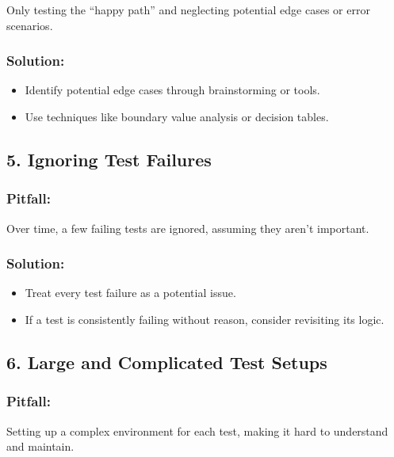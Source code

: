 \documentclass[
]{article}
\providecommand{\tightlist}{%
  \setlength{\itemsep}{0pt}\setlength{\parskip}{0pt}}
\begin{document}
Only testing the ``happy path'' and neglecting potential edge cases or
error scenarios.

\subsubsection{Solution:}\label{solution-3}

\begin{itemize}
\tightlist
\item
  Identify potential edge cases through brainstorming or tools.
\item
  Use techniques like boundary value analysis or decision tables.
\end{itemize}

\subsection{5. Ignoring Test Failures}\label{ignoring-test-failures}

\subsubsection{Pitfall:}\label{pitfall-4}

Over time, a few failing tests are ignored, assuming they aren't
important.

\subsubsection{Solution:}\label{solution-4}

\begin{itemize}
\tightlist
\item
  Treat every test failure as a potential issue.
\item
  If a test is consistently failing without reason, consider revisiting
  its logic.
\end{itemize}

\subsection{6. Large and Complicated Test
Setups}\label{large-and-complicated-test-setups}

\subsubsection{Pitfall:}\label{pitfall-5}

Setting up a complex environment for each test, making it hard to
understand and maintain.
\end{document}

